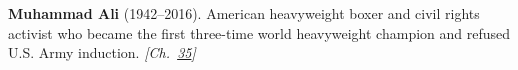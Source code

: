 \textbf{Muhammad Ali} (1942–2016). American heavyweight boxer and civil rights activist who became the first three-time world heavyweight champion and refused U.S. Army induction. \emph{[Ch.~\hyperref[ch:treesfromair]{35}]}

